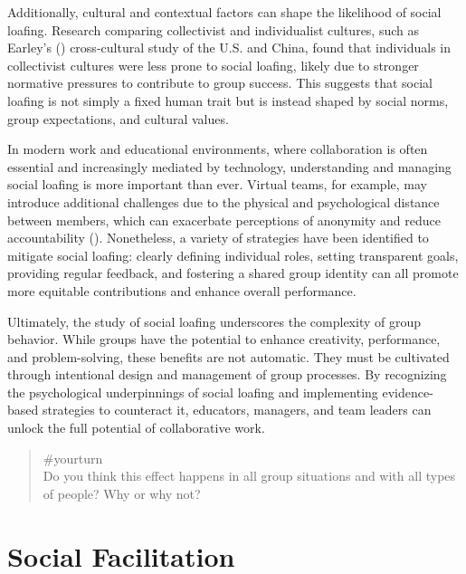 \documentclass[
  letterpaper,
]{book}
\begin{document}
Additionally, cultural and contextual factors can shape the likelihood
of social loafing. Research comparing collectivist and individualist
cultures, such as Earley's ()
cross-cultural study of the U.S. and China, found that individuals in
collectivist cultures were less prone to social loafing, likely due to
stronger normative pressures to contribute to group success. This
suggests that social loafing is not simply a fixed human trait but is
instead shaped by social norms, group expectations, and cultural values.

In modern work and educational environments, where collaboration is
often essential and increasingly mediated by technology, understanding
and managing social loafing is more important than ever. Virtual teams,
for example, may introduce additional challenges due to the physical and
psychological distance between members, which can exacerbate perceptions
of anonymity and reduce accountability
(). Nonetheless, a
variety of strategies have been identified to mitigate social loafing:
clearly defining individual roles, setting transparent goals, providing
regular feedback, and fostering a shared group identity can all promote
more equitable contributions and enhance overall performance.

Ultimately, the study of social loafing underscores the complexity of
group behavior. While groups have the potential to enhance creativity,
performance, and problem-solving, these benefits are not automatic. They
must be cultivated through intentional design and management of group
processes. By recognizing the psychological underpinnings of social
loafing and implementing evidence-based strategies to counteract it,
educators, managers, and team leaders can unlock the full potential of
collaborative work.

\begin{quote}
{\#yourturn}\\
Do you think this effect happens in all group situations and with all
types of people? Why or why not?
\end{quote}


\chapter{\texorpdfstring{{Social
Facilitation}}{Social Facilitation}}\label{social-facilitation}
\end{document}
